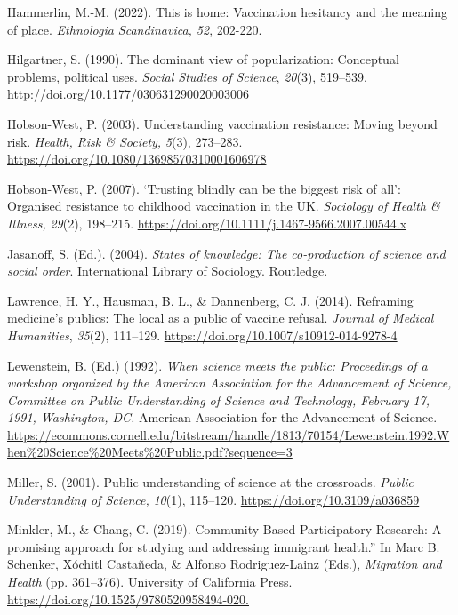\documentclass[authordate, reflection,issue]{jote-new-article}
\begin{document}
	Hammerlin, M.-M. (2022). This is home: Vaccination hesitancy and the meaning of place. \emph{Ethnologia Scandinavica, 52}, 202-220.



	Hilgartner, S. (1990). The dominant view of popularization: Conceptual problems, political uses. \emph{Social Studies of Science}, \emph{20}(3), 519--539. \url{http://doi.org/10.1177/030631290020003006}



	Hobson-West, P. (2003). Understanding vaccination resistance: Moving beyond risk. \emph{Health, Risk \& Society,} \emph{5}(3), 273--283. \url{https://doi.org/10.1080/13698570310001606978}



	Hobson-West, P. (2007). ‘Trusting blindly can be the biggest risk of all': Organised resistance to childhood vaccination in the UK. \emph{Sociology of Health \& Illness,} \emph{29}(2), 198--215. \url{https://doi.org/10.1111/j.1467-9566.2007.00544.x}



	Jasanoff, S. (Ed.). (2004). \emph{States of knowledge: The co-production of science and social order}. International Library of Sociology. Routledge.



	Lawrence, H. Y., Hausman, B. L., \& Dannenberg, C. J. (2014). Reframing medicine's publics: The local as a public of vaccine refusal. \emph{Journal of Medical Humanities}, \emph{35}(2), 111--129. \url{https://doi.org/10.1007/s10912-014-9278-4}



	Lewenstein, B. (Ed.) (1992). \emph{When science meets the public: Proceedings of a workshop organized by the American Association for the Advancement of Science, Committee on Public Understanding of Science and Technology, February 17, 1991, Washington, DC. }American Association for the Advancement of Science. \url{https://ecommons.cornell.edu/bitstream/handle/1813/70154/Lewenstein.1992.When\%20Science\%20Meets\%20Public.pdf?sequence=3}



	Miller, S. (2001). Public understanding of science at the crossroads. \emph{Public Understanding of Science,} \emph{10}(1), 115--120. \url{https://doi.org/10.3109/a036859}



	Minkler, M., \& Chang, C. (2019). Community-Based Participatory Research: A promising approach for studying and addressing immigrant health.” In Marc B. Schenker, Xóchitl Castañeda, \& Alfonso Rodriguez-Lainz (Eds.), \emph{Migration and Health }(pp. 361--376). University of California Press. \url{https://doi.org/10.1525/9780520958494-020.}
\end{document}
